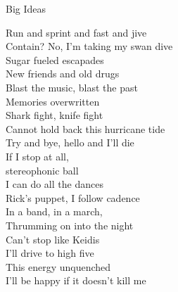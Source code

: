 Big Ideas

Run and sprint and fast and jive \\
Contain? No, I'm taking my swan dive \\
Sugar fueled escapades \\
New friends and old drugs \\
Blast the music, blast the past \\
Memories overwritten \\
Shark fight, knife fight \\
Cannot hold back this hurricane tide \\
Try and bye, hello and I'll die \\
If I stop at all, \\
stereophonic ball \\
I can do all the dances \\
Rick's puppet, I follow cadence \\
In a band, in a march, \\
Thrumming on into the night \\
Can't stop like Keidis \\
I'll drive to high five \\
This energy unquenched \\
I'll be happy if it doesn't kill me \\


